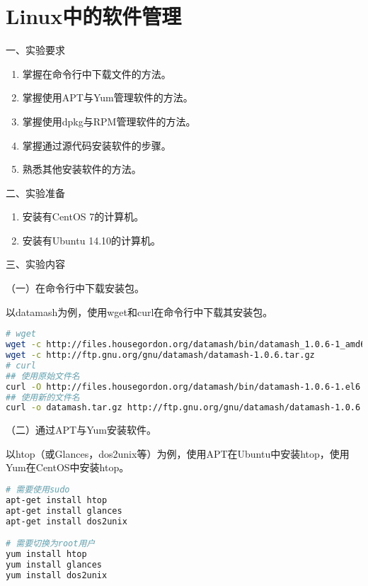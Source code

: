 \chapter{Linux中的软件管理}

\noindent
一、实验要求
\begin{enumerate}
  \item 掌握在命令行中下载文件的方法。
  \item 掌握使用APT与Yum管理软件的方法。
  \item 掌握使用dpkg与RPM管理软件的方法。
  \item 掌握通过源代码安装软件的步骤。
  \item 熟悉其他安装软件的方法。
\end{enumerate}

\vspace{0.2in}
\noindent
二、实验准备
\begin{enumerate}
  \item 安装有CentOS 7的计算机。
  \item 安装有Ubuntu 14.10的计算机。
\end{enumerate}

\vspace{0.2in}
\noindent
三、实验内容

\vspace{0.1in}
（一）在命令行中下载安装包。

以datamash为例，使用wget和curl在命令行中下载其安装包。
\begin{lstlisting}[language=bash]
# wget
wget -c http://files.housegordon.org/datamash/bin/datamash_1.0.6-1_amd64.deb
wget -c http://ftp.gnu.org/gnu/datamash/datamash-1.0.6.tar.gz
# curl
## 使用原始文件名
curl -O http://files.housegordon.org/datamash/bin/datamash-1.0.6-1.el6.x86_64.rpm
## 使用新的文件名
curl -o datamash.tar.gz http://ftp.gnu.org/gnu/datamash/datamash-1.0.6.tar.gz
\end{lstlisting}

\vspace{0.1in}
（二）通过APT与Yum安装软件。

以htop（或Glances，dos2unix等）为例，使用APT在Ubuntu中安装htop，使用Yum在CentOS中安装htop。
\begin{lstlisting}[language=bash]
# 需要使用sudo
apt-get install htop
apt-get install glances
apt-get install dos2unix

# 需要切换为root用户
yum install htop
yum install glances
yum install dos2unix
\end{lstlisting}

